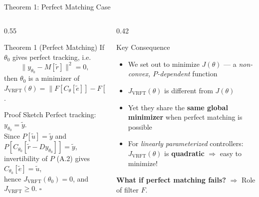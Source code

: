 \documentclass[aspectratio=169]{beamer}
\newcommand{\highlight}[1]{{\color{accentgreen!70!black}\textbf{#1}}}
\newcommand{\JJ}{J_{\mathrm{VRFT}}}
\newcommand{\Jopt}{J}
\begin{document}
\begin{frame}{Theorem 1: Perfect Matching Case}
  \begin{columns}[T]
    \begin{column}{0.55\textwidth}
      \begin{block}{Theorem 1 (Perfect Matching)}
        If $\theta_0$ gives perfect tracking, i.e.\
        \[
          \|y_{\theta_0} - M[\tilde{r}]\|^2 = 0,
        \]
        then $\theta_0$ is a minimizer of $\JJ(\theta) = \|F[C_\theta[\tilde{e}]] - F[\tilde{u}]\|^2$.
      \end{block}
      \vspace{0.4em}
      \begin{block}{Proof Sketch}
        Perfect tracking: $y_{\theta_0} = \tilde{y}$.\\
        Since $P[\tilde{u}] = \tilde{y}$ and $P[C_{\theta_0}[\tilde{r}-Dy_{\theta_0}]] = \tilde{y}$,\\
        invertibility of $P$ (A.2) gives $C_{\theta_0}[\tilde{e}] = \tilde{u}$,\\
        hence $\JJ(\theta_0) = 0$, and $\JJ \geq 0$. \qquad $\square$
      \end{block}
    \end{column}
    \begin{column}{0.42\textwidth}
      \begin{exampleblock}{Key Consequence}
        \begin{itemize}
          \item We set out to minimize $\Jopt(\theta)$ --- a \emph{non-convex, $P$-dependent} function
          \item $\JJ(\theta)$ is different from $\Jopt(\theta)$
          \item Yet they share the \highlight{same global minimizer} when perfect matching is possible
          \item For \emph{linearly parameterized} controllers: $\JJ(\theta)$ is \highlight{quadratic} $\Rightarrow$ easy to minimize!
        \end{itemize}
      \end{exampleblock}
      \vspace{0.3em}
      \textbf{What if perfect matching fails?} $\Rightarrow$ Role of filter $F$.
    \end{column}
  \end{columns}
\end{frame}
\end{document}
